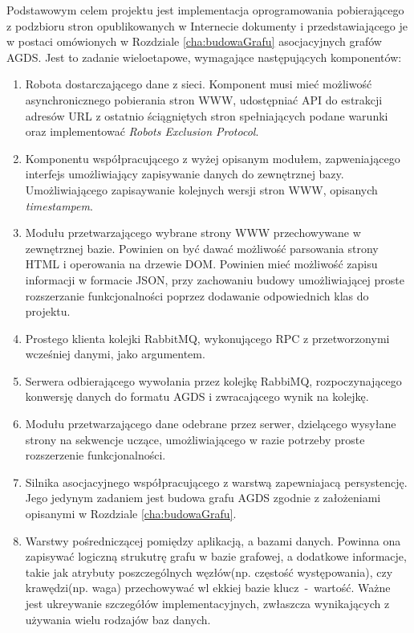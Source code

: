 Podstawowym celem projektu jest implementacja oprogramowania pobierającego z podzbioru stron opublikowanych w Internecie dokumenty i przedstawiającego
je w postaci omówionych w Rozdziale \ref{cha:budowaGrafu} asocjacyjnych grafów AGDS. Jest to zadanie wieloetapowe, wymagające następujących komponentów:
\begin{enumerate}
\item Robota dostarczającego dane z sieci. Komponent musi mieć możliwość asynchronicznego pobierania stron WWW, udostępniać API do estrakcji adresów URL z ostatnio
ściągniętych stron spełniających podane warunki oraz implementować \emph{Robots Exclusion Protocol}.
\item Komponentu współpracującego z wyżej opisanym modułem, zapweniającego interfejs umożliwiający zapisywanie danych do zewnętrznej bazy. Umożliwiającego
zapisaywanie kolejnych wersji stron WWW, opisanych \emph{timestampem}.
\item Modułu przetwarzającego wybrane strony WWW przechowywane w zewnętrznej bazie. Powinien on być dawać możliwość parsowania strony HTML i operowania na drzewie DOM.
Powinien mieć możliwość zapisu informacji w formacie JSON, przy zachowaniu budowy umożliwiającej proste rozszerzanie funkcjonalności poprzez dodawanie odpowiednich klas do projektu.
\item Prostego klienta kolejki RabbitMQ, wykonującego RPC z przetworzonymi wcześniej danymi, jako argumentem.
\item Serwera odbierającego wywołania przez kolejkę RabbiMQ, rozpoczynającego konwersję danych do formatu AGDS i zwracającego wynik na kolejkę.
\item Modułu przetwarzającego dane odebrane przez serwer, dzielącego wysyłane strony na sekwencje uczące, umożliwiającego w razie potrzeby proste rozszerzenie funkcjonalności.
\item Silnika asocjacyjnego współpracującego z warstwą zapewniajacą persystencję. Jego jedynym zadaniem jest budowa grafu AGDS zgodnie z założeniami opisanymi w Rozdziale
\ref{cha:budowaGrafu}.
\item Warstwy pośredniczącej pomiędzy aplikacją, a bazami danych. Powinna ona zapisywać logiczną strukutrę grafu w bazie grafowej, a dodatkowe informacje, takie jak
atrybuty poszczególnych węzłów(np. częstość występowania), czy krawędzi(np. waga) przechowywać wl ekkiej bazie klucz~-~wartość. Ważne jest ukreywanie szczegółów implementacyjnych,
zwłaszcza wynikających z używania wielu rodzajów baz danych.
\end{enumerate}

